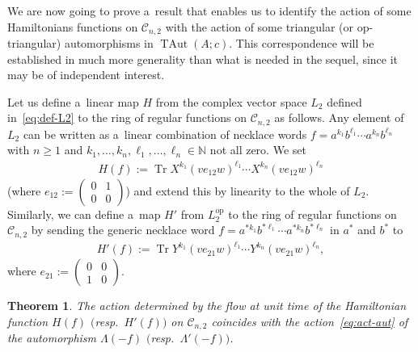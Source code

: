 \documentclass[11pt]{article}
\newtheorem{theorem}{Theorem}
\newcommand{\bb}[1]{\mathbb{#1}}
\newcommand{\smm}[1]{\left(\begin{smallmatrix} #1\end{smallmatrix}\right)}
\DeclareMathOperator{\tr}{Tr}
\DeclareMathOperator{\TAut}{TAut}
\begin{document}
We are now going to prove a~result that enables us to identify the action of some Hamiltonians functions on
\(\mathcal{C}_{n,2}\) with the action of some triangular (or op-triangular) automorphisms in \(\TAut(A;c)\).
This correspondence will be established in much more generality than what is needed in the sequel, since it
may be of independent interest.

Let us def\/ine a~linear map \(H\) from the complex vector space \(L_{2}\) def\/ined in~\eqref{eq:def-L2}
to the ring of regular functions on \(\mathcal{C}_{n,2}\) as follows.
Any element of \(L_{2}\) can be written as a~linear combination of necklace words \(f =
a^{k_{1}}b^{\ell_{1}}\cdots a^{k_{n}}b^{\ell_{n}}\) with \(n\geq 1\) and \(k_{1}, \dots, k_{n}, \ell_{1},
\dots, \ell_{n}\in \bb{N}\) not all zero.
We set
\begin{gather}
\label{eq:def-H}
H(f)\mathrel{:=}\tr X^{k_{1}}(ve_{12}w)^{\ell_{1}}\cdots X^{k_{n}}(ve_{12}w)^{\ell_{n}}
\end{gather}
(where \(e_{12}\mathrel{:=} \smm{0 & 1
\\ %
0 & 0}\)) and extend this by linearity to the whole of \(L_{2}\).
Similarly, we can def\/ine a~map \(H'\) from \(L_{2}^{\mathrm{op}}\) to the ring of regular functions on
\(\mathcal{C}_{n,2}\) by sending the generic necklace word \(f = a^{*k_{1}}b^{*\ell_{1}}\cdots
a^{*k_{n}}b^{*\ell_{n}}\) in \(a^{*}\) and \(b^{*}\) to
\begin{gather}
\label{eq:def-Hp}
H'(f)\mathrel{:=}\tr Y^{k_{1}}(ve_{21}w)^{\ell_{1}}\cdots Y^{k_{n}}(ve_{21}w)^{\ell_{n}},
\end{gather}
where \(e_{21}\mathrel{:=} \smm{0 & 0
\\
1 & 0}\).

\begin{theorem}
\label{teo:flows}
The action determined by the flow at unit time of the Hamiltonian function \(H(f)\) $($resp.\
\(H'(f))\) on \(\mathcal{C}_{n,2}\) coincides with the action~\eqref{eq:act-aut} of the automorphism
\(\Lambda(-f)\) $($resp.\
\(\Lambda'(-f))\).
\end{theorem}
\end{document}
